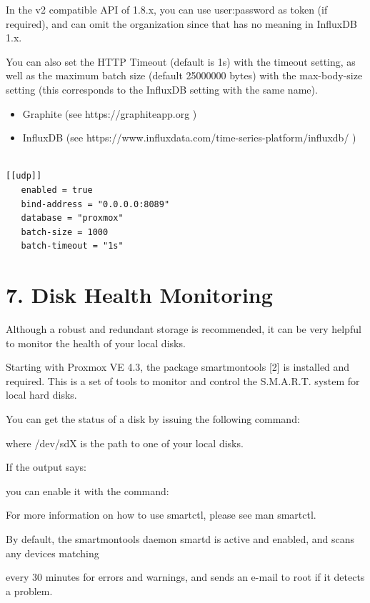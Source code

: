In the v2 compatible API of 1.8.x, you can use user:password as token (if required), and can omit the organization since that has no meaning in InfluxDB 1.x.

You can also set the HTTP Timeout (default is 1s) with the timeout setting, as well as the maximum batch size (default 25000000 bytes) with the max-body-size setting (this corresponds to the InfluxDB setting with the same name).

\begin{itemize}[leftmargin=2cm]

	\item Graphite (see https://graphiteapp.org )

	\item InfluxDB (see https://www.influxdata.com/time-series-platform/influxdb/ )

\end{itemize}

\begin{lstlisting}

[[udp]]
   enabled = true
   bind-address = "0.0.0.0:8089"
   database = "proxmox"
   batch-size = 1000
   batch-timeout = "1s"

\end{lstlisting}


\section{7. Disk Health Monitoring}

Although a robust and redundant storage is recommended, it can be very helpful to monitor the health of your local disks.

Starting with Proxmox VE 4.3, the package smartmontools [2] is installed and required. This is a set of tools to monitor and control the S.M.A.R.T. system for local hard disks.

You can get the status of a disk by issuing the following command:

where /dev/sdX is the path to one of your local disks.

If the output says:

you can enable it with the command:

For more information on how to use smartctl, please see man smartctl.

By default, the smartmontools daemon smartd is active and enabled, and scans any devices matching

every 30 minutes for errors and warnings, and sends an e-mail to root if it detects a problem.

